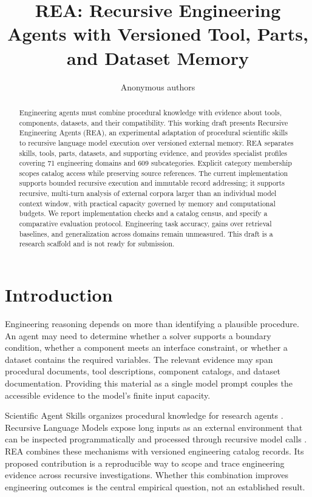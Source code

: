 \documentclass{article}
\title{REA: Recursive Engineering Agents with Versioned Tool, Parts, and Dataset Memory}
\author{Anonymous authors}
\begin{document}
\maketitle
\begin{abstract}
Engineering agents must combine procedural knowledge with evidence about tools, components, datasets, and their compatibility. This working draft presents Recursive Engineering Agents (REA), an experimental adaptation of procedural scientific skills to recursive language model execution over versioned external memory. REA separates skills, tools, parts, datasets, and supporting evidence, and provides specialist profiles covering 71 engineering domains and 609 subcategories. Explicit category membership scopes catalog access while preserving source references. The current implementation supports bounded recursive execution and immutable record addressing; it supports recursive, multi-turn analysis of external corpora larger than an individual model context window, with practical capacity governed by memory and computational budgets. We report implementation checks and a catalog census, and specify a comparative evaluation protocol. Engineering task accuracy, gains over retrieval baselines, and generalization across domains remain unmeasured. This draft is a research scaffold and is not ready for submission.
\end{abstract}

\section{Introduction}
Engineering reasoning depends on more than identifying a plausible procedure. An agent may need to determine whether a solver supports a boundary condition, whether a component meets an interface constraint, or whether a dataset contains the required variables. The relevant evidence may span procedural documents, tool descriptions, component catalogs, and dataset documentation. Providing this material as a single model prompt couples the accessible evidence to the model's finite input capacity.

Scientific Agent Skills organizes procedural knowledge for research agents \citep{Kassis.2026}. Recursive Language Models expose long inputs as an external environment that can be inspected programmatically and processed through recursive model calls \citep{Zhang.2025}. REA combines these mechanisms with versioned engineering catalog records. Its proposed contribution is a reproducible way to scope and trace engineering evidence across recursive investigations. Whether this combination improves engineering outcomes is the central empirical question, not an established result.
\end{document}
